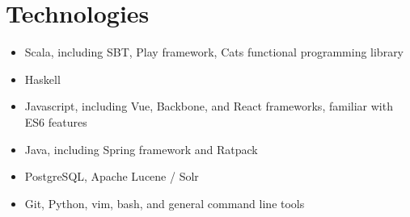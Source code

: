 \documentclass[10pt]{article}
\begin{document}
\section*{Technologies}
\begin{multicols}{2}
\begin{itemize}
    \itemsep0em
    \item Scala, including SBT, Play framework, Cats functional programming library
    \item Haskell
    \item Javascript, including Vue, Backbone, and React frameworks, familiar with ES6 features
    \item Java, including Spring framework and Ratpack
    \item PostgreSQL, Apache Lucene / Solr
    \item Git, Python, vim, bash, and general command line tools
\end{itemize}
\end{multicols}
\end{document}
